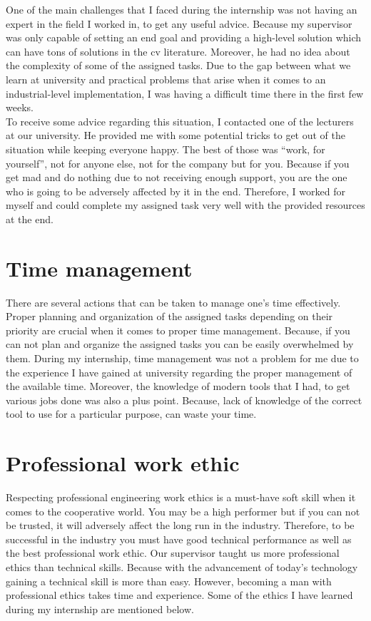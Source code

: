 \documentclass[a4paper,12pt]{report}
\begin{document}
One of the main challenges that I faced during the internship was not having an expert in the field I worked in, to get any useful advice. Because my supervisor was only capable of setting an end goal and providing a high-level solution which can have tons of solutions in the \ac{cv} literature. Moreover, he had no idea about the complexity of some of the assigned tasks. Due to the gap between what we learn at university and practical problems that arise when it comes to an industrial-level implementation, I was having a difficult time there in the first few weeks.\\

To receive some advice regarding this situation, I contacted one of the lecturers at our university. He provided me with some potential tricks to get out of the situation while keeping everyone happy. The best of those was ``work, for yourself'', not for anyone else, not for the company but for you. Because if you get mad and do nothing due to not receiving enough support, you are the one who is going to be adversely affected by it in the end. Therefore, I worked for myself and could complete my assigned task very well with the provided resources at the end.  



\section{Time management} 

There are several actions that can be taken to manage one's time effectively.  Proper planning and organization of the assigned tasks depending on their priority are crucial when it comes to proper time management. Because, if you can not plan and organize the assigned tasks you can be easily overwhelmed by them. During my internship, time management was not a problem for me due to the experience I have gained at university regarding the proper management of the available time. Moreover, the knowledge of modern tools that I had, to get various jobs done was also a plus point. Because, lack of knowledge of the correct tool to use for a particular purpose, can waste your time.

\section{Professional work ethic}
Respecting professional engineering work ethics is a must-have soft skill when it comes to the cooperative world. You may be a high performer but if you can not be trusted, it will adversely affect the long run in the industry. Therefore, to be successful in the industry you must have good technical performance as well as the best professional work ethic. Our supervisor taught us more professional ethics than technical skills. Because with the advancement of today's technology gaining a technical skill is more than easy. However, becoming a man with professional ethics takes time and experience. Some of the ethics I have learned during my internship are mentioned below.
\end{document}
